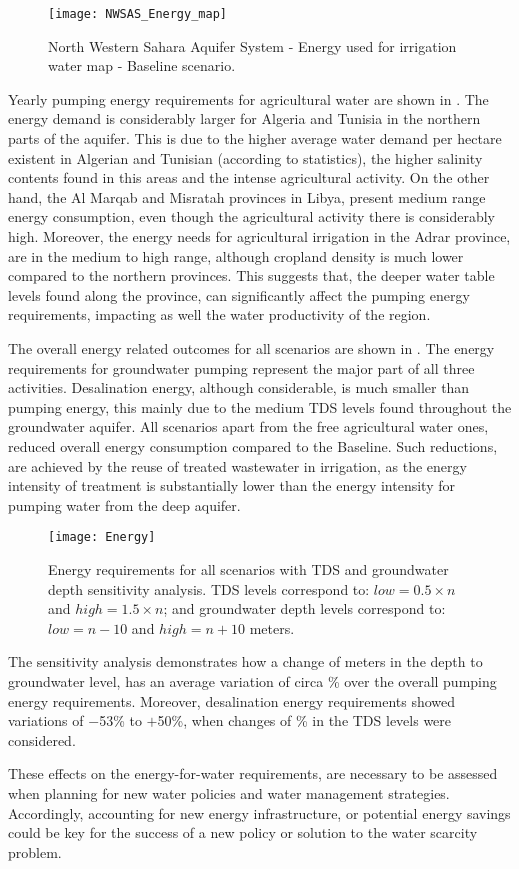 \begin{figure*}[!b]
	\centering
	\texttt{[image: NWSAS\_Energy\_map]}
	\caption[NWSAS energy used for irrigation water map - Baseline scenario]{North Western Sahara Aquifer System - Energy used for irrigation water map - Baseline scenario.}
	\label{fig:energy_map}
\end{figure*}

Yearly pumping energy requirements for agricultural water are shown in . The energy demand is considerably larger for Algeria and Tunisia in the northern parts of the aquifer. This is due to the higher average water demand per hectare existent in Algerian and Tunisian (according to statistics), the higher salinity contents found in this areas and the intense agricultural activity. On the other hand, the Al Marqab and Misratah provinces in Libya, present medium range energy consumption, even though the agricultural activity there is considerably high. Moreover, the energy needs for agricultural irrigation in the Adrar province, are in the medium to high range, although cropland density is much lower compared to the northern provinces. This suggests that, the deeper water table levels found along the province, can significantly affect the pumping energy requirements, impacting as well the water productivity of the region.

The overall energy related outcomes for all scenarios are shown in . The energy requirements for groundwater pumping represent the major part of all three activities. Desalination energy, although considerable, is much smaller than pumping energy, this mainly due to the medium TDS levels found throughout the groundwater aquifer. All scenarios apart from the free agricultural water ones, reduced overall energy consumption compared to the Baseline. Such reductions, are achieved by the reuse of treated wastewater in irrigation, as the energy intensity of treatment is substantially lower than the energy intensity for pumping water from the deep aquifer.

\begin{figure*}[!ht]
\texttt{[image: Energy]}
\caption{Energy requirements for all scenarios with TDS and groundwater depth sensitivity analysis. TDS levels correspond to: $low=0.5\times n$ and $high=1.5\times n$; and groundwater depth levels correspond to: $low=n-10$ and $high=n+10$ meters.}
\label{fig:energy}
\end{figure*}

The sensitivity analysis demonstrates how a change of  meters in the depth to groundwater level, has an average variation of circa \% over the overall pumping energy requirements. Moreover, desalination energy requirements showed variations of $-$53\% to $+$50\%, when changes of \% in the TDS levels were considered.

These effects on the energy-for-water requirements, are necessary to be assessed when planning for new water policies and water management strategies. Accordingly, accounting for new energy infrastructure, or potential energy savings could be key for the success of a new policy or solution to the water scarcity problem.